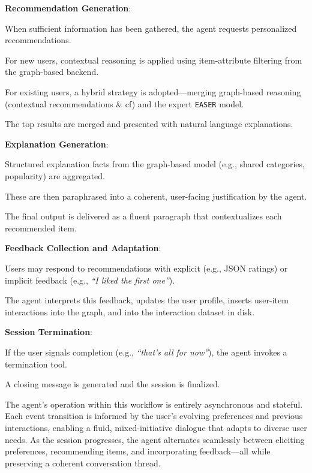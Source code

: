 \begin{compactenum}
    \item \textbf{Recommendation Generation}:
    \begin{compactitem}
        \item When sufficient information has been gathered, the agent requests personalized recommendations.
        \item For new users, contextual reasoning is applied using item-attribute filtering from the graph-based backend.
        \item For existing users, a hybrid strategy is adopted---merging graph-based reasoning (contextual recommendations \& \acl{cf}) and the expert \texttt{EASER} model.
        \item The top results are merged and presented with natural language explanations.
    \end{compactitem}

    \item \textbf{Explanation Generation}:
    \begin{compactitem}
        \item Structured explanation facts from the graph-based model (e.g., shared categories, popularity) are aggregated.
        \item These are then paraphrased into a coherent, user-facing justification by the agent.
        \item The final output is delivered as a fluent paragraph that contextualizes each recommended item.
    \end{compactitem}

    \item \textbf{Feedback Collection and Adaptation}:
    \begin{compactitem}
        \item Users may respond to recommendations with explicit (e.g., JSON ratings) or implicit feedback (e.g., \textit{``I liked the first one''}).
        \item The agent interprets this feedback, updates the user profile, inserts user-item interactions into the graph, and into the interaction dataset in disk.
    \end{compactitem}

    \item \textbf{Session Termination}:
    \begin{compactitem}
        \item If the user signals completion (e.g., \textit{``that's all for now''}), the agent invokes a termination tool.
        \item A closing message is generated and the session is finalized.
    \end{compactitem}
\end{compactenum}

The agent's operation within this workflow is entirely asynchronous and stateful. Each event transition is informed by the user's evolving preferences and previous interactions, enabling a fluid, mixed-initiative dialogue that adapts to diverse user needs. As the session progresses, the agent alternates seamlessly between eliciting preferences, recommending items, and incorporating feedback---all while preserving a coherent conversation thread.
